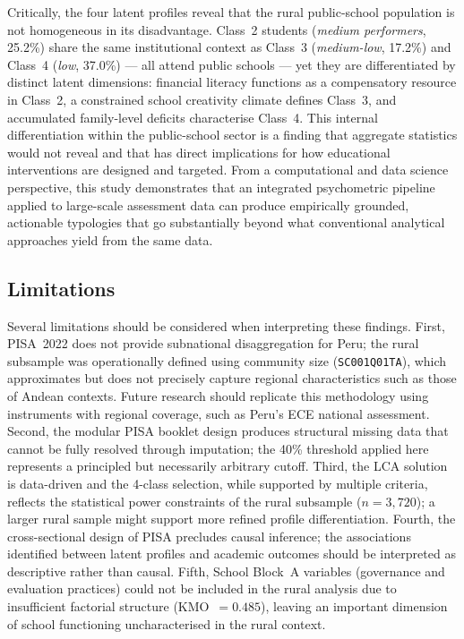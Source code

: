 \documentclass[twocolumn,12pt]{article}
\begin{document}
Critically, the four latent profiles reveal that the rural public-school
population is not homogeneous in its disadvantage. Class~2 students
(\textit{medium performers}, 25.2\%) share the same institutional context
as Class~3 (\textit{medium-low}, 17.2\%) and Class~4 (\textit{low}, 37.0\%)
--- all attend public schools --- yet they are differentiated by distinct
latent dimensions: financial literacy functions as a compensatory resource in
Class~2, a constrained school creativity climate defines
Class~3, and accumulated family-level deficits characterise
Class~4. This internal differentiation
within the public-school sector is a finding that aggregate statistics would
not reveal and that has direct implications for how educational interventions
are designed and targeted. From a computational and data science perspective,
this study demonstrates that an integrated psychometric pipeline applied to
large-scale assessment data can produce empirically grounded, actionable
typologies that go substantially beyond what conventional analytical
approaches yield from the same data.

\subsection{Limitations}

Several limitations should be considered when interpreting these findings.
First, PISA~2022 does not provide subnational disaggregation for Peru; the
rural subsample was operationally defined using community size
(\texttt{SC001Q01TA}), which approximates but does not precisely capture
regional characteristics such as those of Andean contexts. Future research
should replicate this methodology using instruments with regional coverage,
such as Peru's ECE national assessment. Second, the modular PISA booklet
design produces structural missing data that cannot be fully resolved through
imputation; the 40\% threshold applied here represents a principled but
necessarily arbitrary cutoff. Third, the LCA solution is data-driven and
the 4-class selection, while supported by multiple criteria, reflects the
statistical power constraints of the rural subsample ($n = 3{,}720$); a
larger rural sample might support more refined profile differentiation.
Fourth, the cross-sectional design of PISA precludes causal inference; the
associations identified between latent profiles and academic outcomes should
be interpreted as descriptive rather than causal. Fifth, School Block~A
variables (governance and evaluation practices) could not be included in the
rural analysis due to insufficient factorial structure (KMO~$= 0.485$),
leaving an important dimension of school functioning uncharacterised in the
rural context.
\end{document}

